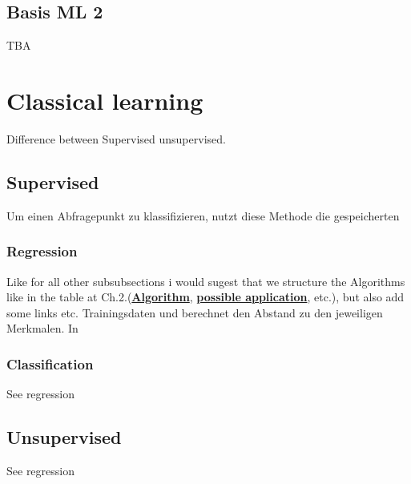 \documentclass[a4paper,titlepage]{article}
\numberwithin{equation}{section} %
\begin{document}

\subsection{Basis ML 2}
TBA





\newpage

\section{Classical learning}
Difference between Supervised unsupervised.



\subsection{Supervised}
Um einen Abfragepunkt zu klassifizieren, nutzt diese Methode die gespeicherten


\subsubsection{Regression}
Like for all other subsubsections i would sugest that we structure the Algorithms like in the table at Ch.2.(\textbf{\underline{Algorithm}}, \textbf{\underline{possible application}}, etc.), but also add some links etc. Trainingsdaten und berechnet den Abstand zu den jeweiligen Merkmalen. In 
 

\subsubsection{Classification}
See regression

\subsection{Unsupervised}
See regression

\end{document}
